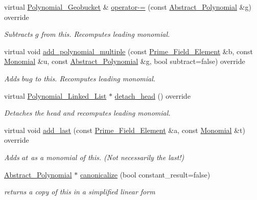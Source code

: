 \begin{Indent}
\begin{DoxyCompactItemize}
\mbox{\label{group__polygroup_adceeadff156d68eb4af0492d5cbd46b5}} 
virtual \hyperlink{group__polygroup_class_polynomial___geobucket}{Polynomial\+\_\+\+Geobucket} \& \hyperlink{group__polygroup_adceeadff156d68eb4af0492d5cbd46b5}{operator-\/=} (const \hyperlink{group__polygroup_class_abstract___polynomial}{Abstract\+\_\+\+Polynomial} \&g) override
\begin{DoxyCompactList}\small\item\em Subtracts $g$ from {\ttfamily this}. Recomputes leading monomial. \end{DoxyCompactList}\item 
\mbox{\label{group__polygroup_a69a7a060044c2cb3aa32ba5c321a9eb4}} 
virtual void \hyperlink{group__polygroup_a69a7a060044c2cb3aa32ba5c321a9eb4}{add\+\_\+polynomial\+\_\+multiple} (const \hyperlink{group___fields_group_class_prime___field___element}{Prime\+\_\+\+Field\+\_\+\+Element} \&b, const \hyperlink{group__polygroup_class_monomial}{Monomial} \&u, const \hyperlink{group__polygroup_class_abstract___polynomial}{Abstract\+\_\+\+Polynomial} \&g, bool subtract=false) override
\begin{DoxyCompactList}\small\item\em Adds $bug$ to {\ttfamily this}. Recomputes leading monomial. \end{DoxyCompactList}\item 
\mbox{\label{group__polygroup_a57606623bed3fcd4f7b38530af211346}} 
virtual \hyperlink{group__polygroup_class_polynomial___linked___list}{Polynomial\+\_\+\+Linked\+\_\+\+List} $\ast$ \hyperlink{group__polygroup_a57606623bed3fcd4f7b38530af211346}{detach\+\_\+head} () override
\begin{DoxyCompactList}\small\item\em Detaches the head and recomputes leading monomial. \end{DoxyCompactList}\item 
virtual void \hyperlink{group__polygroup_ada4a539d3666cd6801a75c8861bc35fa}{add\+\_\+last} (const \hyperlink{group___fields_group_class_prime___field___element}{Prime\+\_\+\+Field\+\_\+\+Element} \&a, const \hyperlink{group__polygroup_class_monomial}{Monomial} \&t) override
\begin{DoxyCompactList}\small\item\em Adds $at$ as a monomial of {\ttfamily this}. (Not necessarily the last!) \end{DoxyCompactList}\item 
\hyperlink{group__polygroup_class_abstract___polynomial}{Abstract\+\_\+\+Polynomial} $\ast$ \hyperlink{group__polygroup_aa76d2c0dce16690b01e8a8c4862b11c5}{canonicalize} (bool constant\+\_\+result=false)
\begin{DoxyCompactList}\small\item\em returns a copy of {\ttfamily this} in a simplified linear form \end{DoxyCompactList}\end{DoxyCompactItemize}
\end{Indent}
